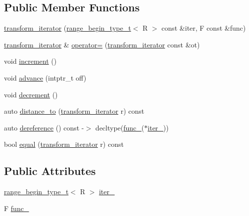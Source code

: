 \subsection*{Public Member Functions}
\begin{DoxyCompactItemize}
\item 
\mbox{\hyperlink{structrah_1_1view_1_1transform__iterator_ae8f127be961b14896c87d94e710a9a1a}{transform\+\_\+iterator}} (\mbox{\hyperlink{namespacerah_a28aff4eeddcece6be65ff0b956d32d4a}{range\+\_\+begin\+\_\+type\+\_\+t}}$<$ R $>$ const \&iter, F const \&func)
\item 
\mbox{\hyperlink{structrah_1_1view_1_1transform__iterator}{transform\+\_\+iterator}} \& \mbox{\hyperlink{structrah_1_1view_1_1transform__iterator_a4589b5fff7d8505b8a569c9d1f863929}{operator=}} (\mbox{\hyperlink{structrah_1_1view_1_1transform__iterator}{transform\+\_\+iterator}} const \&ot)
\item 
void \mbox{\hyperlink{structrah_1_1view_1_1transform__iterator_a1ee5c30f733b63b1cd26baa121389dd1}{increment}} ()
\item 
void \mbox{\hyperlink{structrah_1_1view_1_1transform__iterator_a56c602664659b11bfca3da418c6977be}{advance}} (intptr\+\_\+t off)
\item 
void \mbox{\hyperlink{structrah_1_1view_1_1transform__iterator_a05c99213d071102e793d57b967f7880d}{decrement}} ()
\item 
auto \mbox{\hyperlink{structrah_1_1view_1_1transform__iterator_ae0919c95985ebca42017346da790c981}{distance\+\_\+to}} (\mbox{\hyperlink{structrah_1_1view_1_1transform__iterator}{transform\+\_\+iterator}} r) const
\item 
auto \mbox{\hyperlink{structrah_1_1view_1_1transform__iterator_a56d249781f59970fe4bef45877c58943}{dereference}} () const -\/$>$ decltype(\mbox{\hyperlink{structrah_1_1view_1_1transform__iterator_a02ac2e8035d0b7917ee44967069def0d}{func\+\_\+}}($\ast$\mbox{\hyperlink{structrah_1_1view_1_1transform__iterator_ac3c20401254ca24682913ba0e9c56284}{iter\+\_\+}}))
\item 
bool \mbox{\hyperlink{structrah_1_1view_1_1transform__iterator_a68105373ae5ce99863589e17605f3833}{equal}} (\mbox{\hyperlink{structrah_1_1view_1_1transform__iterator}{transform\+\_\+iterator}} r) const
\end{DoxyCompactItemize}
\subsection*{Public Attributes}
\begin{DoxyCompactItemize}
\item 
\mbox{\hyperlink{namespacerah_a28aff4eeddcece6be65ff0b956d32d4a}{range\+\_\+begin\+\_\+type\+\_\+t}}$<$ R $>$ \mbox{\hyperlink{structrah_1_1view_1_1transform__iterator_ac3c20401254ca24682913ba0e9c56284}{iter\+\_\+}}
\item 
F \mbox{\hyperlink{structrah_1_1view_1_1transform__iterator_a02ac2e8035d0b7917ee44967069def0d}{func\+\_\+}}
\end{DoxyCompactItemize}


